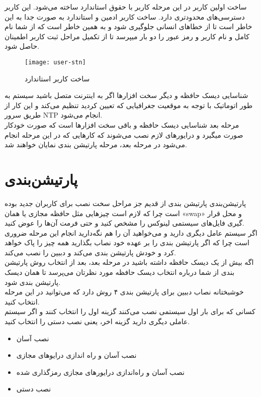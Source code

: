 \begin{frame}{ساخت اولین کاربر}
  در این مرحله کاربر با حقوق استاندارد ساخته می‌شود. این کاربر دسترسی‌های محدودتری دارد.
  ساخت کاربر ادمین و استاندارد به صورت جدا به این خاطر است تا از خطاهای انسانی جلوگیری شود و به همین خاطر است که از شما نام کامل و نام کاربر و رمز عبور را دو بار میپرسد تا از تکمیل مراحل ثبت کاربر اطمینان حاصل شود.
  \begin{figure}
    \texttt{[image: user-stn]}
    \caption{ساخت کاربر استاندارد~\cite{fig:deb_user_stn}}
  \end{figure}
\end{frame}
\begin{frame}{شناسایی دیسک حافظه و دیگر سخت افزارها}
  اگر به اینترنت متصل باشید سیستم به طور اتوماتیک با توجه به موقعیت جغرافیایی که تعیین کردید تنظیم می‌کند و این کار از طریق سرور NTP انجام می‌شود.\\
  مرحله بعد شناسایی دیسک حافظه و باقی سخت افزارها است که صورت خودکار صورت میگیرد و درایورهای لازم نصب می‌شوند که کارهایی که در این مرحله انجام می‌شود در مرحله بعد، مرحله پارتیشن بندی نمایان خواهند شد.
\end{frame}
\section{پارتیشن‌بندی}
\begin{frame}{پارتیشن‌بندی}
  پارتیشن بندی از قدیم جز مراحل سخت نصب برای کاربران جدید بوده است چرا که لازم است چیزهایی مثل حافظه مجازی یا همان «swap» و محل قرار گیری فایل‌های سیستمی لینوکس را مشخص کنید و حتی فرمت آن‌ها را عوض کنید.\\
  اگر سیستم عامل دیگری دارید و می‌خواهید آن را هم نگه‌دارید انجام این مرحله ضروری است چرا که اگر پارتیشن بندی را بر عهده خود نصاب بگذارید همه چیز را پاک خواهد کرد و خودش پارتیشن بندی می‌کند و دببین را نصب می‌کند.\\
  اگه بیش از یک دیسک حافظه داشته باشید در مرحله بعد، بعد از انتخاب روش پارتیشن بندی از شما درباره انتخاب دیسک حافظه مورد نظرتان می‌پرسد تا همان دیسک پارتیشن بندی شود.\\
  خوشبختانه نصاب دببین برای پارتیشن بندی ۴ روش دارد که می‌توانید در این مرحله انتخاب کنید.\\
  کسانی که برای بار اول سیستمی نصب می‌کنند گزینه اول را انتخاب کنند و اگر سیستم عاملی دیگری دارید گزینه اخر، یعنی نصب دستی را انتخاب کنید.\\
  \begin{itemize}
    \item نصب آسان
    \item نصب آسان و راه اندازی درایوهای مجازی
    \item نصب آسان و راه‌اندازی درایورهای مجازی رمزگذاری شده
    \item نصب دستی
  \end{itemize}
\end{frame}

